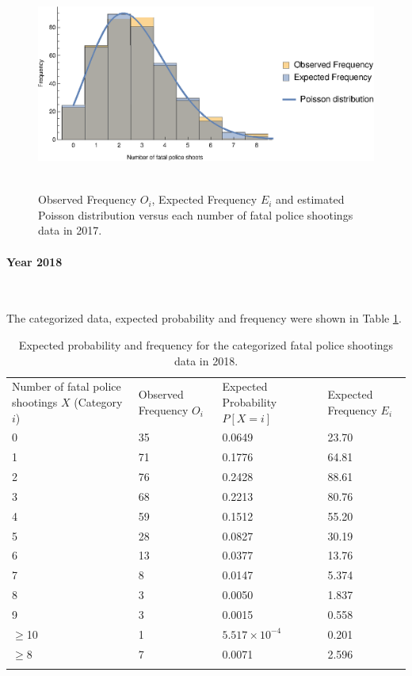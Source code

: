 \documentclass[conf]{new-aiaa}
\begin{document}
\begin{figure}[!htbp]
\centering
\includegraphics[height=7cm]{q3/q3-2017-exp.eps}
\caption{Observed Frequency $O_i$, Expected Frequency $E_i$ and estimated Poisson distribution versus each number of fatal police shootings data in 2017.}
\label{fig:q3-2017-exp}
\end{figure}

\paragraph{Year 2018}\ 

The categorized data, expected probability and frequency were shown in Table \ref{tab:q3-2018-exp}. \medskip

\begin{table}[!htbp]
\centering
\begin{tabular}{m{3cm}<{\centering}m{3cm}<{\centering}m{3cm}<{\centering}m{3cm}<{\centering}}
\toprule 
\toprule
Number of fatal police shootings $X$ (Category $i$)
 & Observed Frequency $O_i$ 
& Expected Probability $P[X=i]$ & Expected Frequency $E_i$ \\
\noalign{\smallskip}\hline\noalign{\smallskip}
0  &   35   & 0.0649  & 23.70\\
1  &   71   & 0.1776   & 64.81\\
2  &   76   & 0.2428   & 88.61\\
3  &   68   & 0.2213   & 80.76\\
4  &   59   & 0.1512   & 55.20\\
5  &   28   & 0.0827  & 30.19\\
6  &   13   & 0.0377  & 13.76\\
7  &   8    & 0.0147  & 5.374\\
8  &   3    & 0.0050  & 1.837\\
9  &   3    & 0.0015  & 0.558\\
$\geqslant$10  &   1    & $5.517\times10^{-4}$  & 0.201\\\hline
$\geqslant$8  &   7    & 0.0071  & 2.596\\
\bottomrule 
\bottomrule  \smallskip
\end{tabular}
\caption{Expected probability and frequency for the categorized fatal police shootings data in 2018.}
\label{tab:q3-2018-exp}
\end{table}
\end{document}
